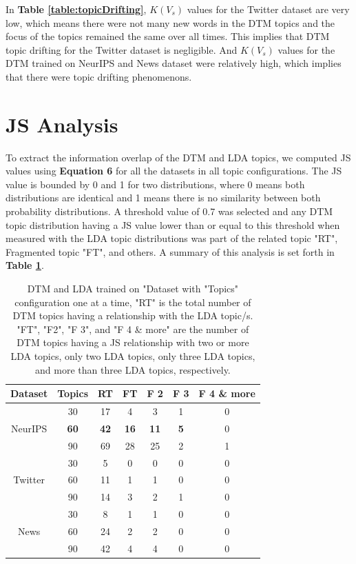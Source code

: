 In \textbf{Table \ref{table:topicDrifting}}, $K(V_s)$ values for the Twitter dataset are very low, which means there were not many new words in the DTM topics and the focus of the topics remained the same over all times. This implies that DTM topic drifting for the Twitter dataset is negligible. And $K(V_s)$ values for the DTM trained on NeurIPS and News dataset were relatively high, which implies that there were topic drifting phenomenons.

\section{JS Analysis}
To extract the information overlap of the DTM and LDA topics, we computed JS values using \textbf{Equation 6} for all the datasets in all topic configurations. The JS value is bounded by 0 and 1 for two distributions, where 0 means both distributions are identical and 1 means there is no similarity between both probability distributions. A threshold value of 0.7 was selected and any DTM topic distribution having a JS value lower than or equal to this threshold when measured with the LDA topic distributions was part of the related topic "RT", Fragmented topic "FT", and others. A summary of this analysis is set forth in \textbf{Table \ref{table:JStable}}.

\begin{table}[h!]
\begin{center}
\begin{tabular}{|c|c|c|c|c|c|c|}
\hline \textbf{Dataset} & \textbf{Topics} & \textbf{RT}& \textbf{FT} & \textbf{F 2} & \textbf{F 3} & \textbf{F 4 \& more} \\ \hline

\multirow{3}{*}{NeurIPS}  & 30 & 17 & 4 & 3 & 1 & 0 \\ & \textbf{60} & \textbf{42} & \textbf{16} & \textbf{11} & \textbf{5} & 0  \\ & 90 & 69 & 28 & 25 & 2 & 1 \\ \hline
\multirow{3}{*}{Twitter}  & 30 & 5 & 0 & 0 & 0 & 0 \\ & 60 & 11 & 1 & 1 & 0 & 0 \\ & 90 & 14 & 3 & 2 & 1 & 0 \\ \hline
\multirow{3}{*}{News}  & 30 & 8 & 1 & 1 & 0 & 0 \\ & 60 & 24 & 2 & 2 & 0 & 0 \\ & 90 & 42 & 4 & 4 & 0 & 0 \\ \hline

\end{tabular}
\caption{DTM and LDA trained on "Dataset with "Topics" configuration one at a time, "RT" is the total number of DTM topics having a relationship with the LDA topic/s. "FT", "F2", "F 3", and "F 4 \& more" are the number of DTM topics having a JS relationship with two or more LDA topics, only two LDA topics, only three LDA topics, and more than three LDA topics, respectively.}
\label{table:JStable}
\end{center}
\end{table}

